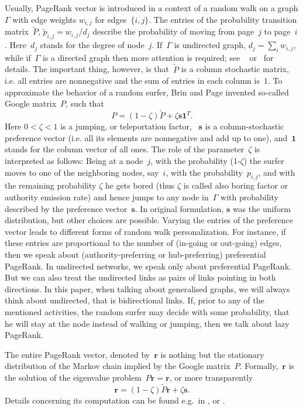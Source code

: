 \documentclass{fundam}
\begin{document}
Usually, PageRank vector is introduced in a context of a random walk on a graph $\Gamma$ with edge weights $w_{i,j}$ for edges~$\{i,j\}$. The entries of the probability transition matrix~$\tilde{P}$, $\tilde{p}_{i,j} = w_{i,j}/d_j$ describe the probability of moving from page~$j$ to page~$i$. Here~$d_j$ stands for the degree of node~$j$. If~$\Gamma$ is undirected graph, $d_j = \sum_i w_{i,j}$, while if~$\Gamma$ is a directed graph then  more attention is required; see ~\cite{Page:1999} or~\cite[Ch. 4]{LM06} for details. The important thing, however, is that~$\tilde{P}$ is a column stochastic matrix, i.e. all entries are nonnegative and the sum of entries in each column is~$1$.  To approximate the behavior of a random surfer, Brin and Page invented so-called Google matrix~$P$, such that
\[P = (1-\zeta)\tilde{P} + \zeta\mathbf{s}\mathbf{1}^T.
\]
Here $0 < \zeta < 1$ is a jumping, or teleportation factor, ~$\mathbf{s}$ is a column-stochastic preference vector (i.e. all its elements are nonnegative and add up to one), and~$\mathbf{1}$ stands for the column vector of all ones. The role of the parameter~$\zeta$ is interpreted as follows: Being at a node~$j$, with the probability (1-$\zeta$) the surfer moves to one of the neighboring nodes, say~$i$, with the probability~$p_{i, j}$, and with the remaining probability $\zeta$ he gets bored (thus $\zeta$ is called also boring factor or authority emission rate) and hence jumps to any node in~$\Gamma$ with probability described by the preference vector~$\mathbf{s}$. In original formulation, $\mathbf{s}$ was the uniform distribution, but other choices are possible. Varying the entries of the preference vector leads to different forms of random walk personalization.
For instance, if these entries are proportional to the number of (in-going or out-going) edges, then we speak about  (authority-preferring or hub-preferring) preferential PageRank. In undirected networks, we speak only about preferential PageRank. But we can also treat the undirected links as pairs of links pointing in both directions.
In this paper, when talking about generalised graphs, we will always think about undirected, that is bidirectional links.
If, prior to any of the mentioned activities, the random surfer may decide with some probability, that he will stay at the node instead of walking or jumping, then we talk about lazy PageRank.

\medskip
The entire PageRank vector, denoted by~$\mathbf{r}$ is nothing but the stationary distribution of the Markov chain implied by the Google matrix~$P$. Formally,~$\mathbf{r}$ is the solution of the eigenvalue problem~$P\mathbf{r} = \mathbf{r}$, or more transparently
\[ \mathbf{r} = (1-\zeta)\tilde{P}\mathbf{r} + \zeta \mathbf{s}.
\]
Details concerning its computation can be found e.g.\  in  \cite{Chung14}, or \cite{Gleich15}.
\end{document}
